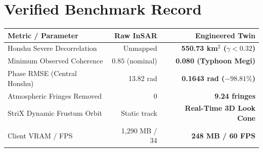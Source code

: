 \documentclass[10pt,letterpaper]{article}
\begin{document}
\begin{minipage}[t]{0.51\textwidth}
    \section*{Verified Benchmark Record}
    \footnotesize
    \begin{tabularx}{\linewidth}{X r r}
        \toprule
        \textbf{Metric / Parameter} & \textbf{Raw InSAR} & \textbf{Engineered Twin} \\
        \midrule
        Honshu Severe Decorrelation & Unmapped & \textbf{550.73 km$^2$ ($\gamma < 0.32$)} \\
        Minimum Observed Coherence & $0.85$ (nominal) & \textbf{0.080 (Typhoon Megi)} \\
        Phase RMSE (Central Honshu) & 13.82 rad & \textbf{0.1643 rad ($-98.81\%$)} \\
        Atmospheric Fringes Removed & 0 & \textbf{9.24 fringes} \\
        StriX Dynamic Frustum Orbit & Static track & \textbf{Real-Time 3D Look Cone} \\
        Client VRAM / FPS & 1,290 MB / 34 & \textbf{248 MB / 60 FPS} \\
        \bottomrule
    \end{tabularx}
\end{minipage}
\hfill
\end{document}
